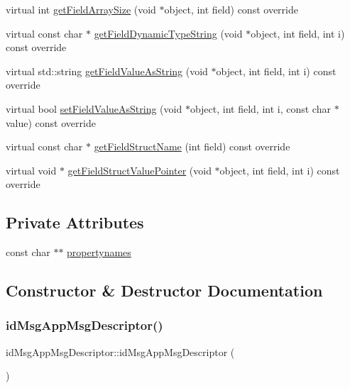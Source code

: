 \begin{DoxyCompactItemize}
virtual int \hyperlink{classidMsgAppMsgDescriptor_a55b2f838a298f91b5a0ca06fab71bcad}{get\+Field\+Array\+Size} (void $\ast$object, int field) const override
\item 
virtual const char $\ast$ \hyperlink{classidMsgAppMsgDescriptor_a166e1858ebf5b4c0115b540601799992}{get\+Field\+Dynamic\+Type\+String} (void $\ast$object, int field, int i) const override
\item 
virtual std\+::string \hyperlink{classidMsgAppMsgDescriptor_a42e71d687276c6b4ffd5d812eb9216a3}{get\+Field\+Value\+As\+String} (void $\ast$object, int field, int i) const override
\item 
virtual bool \hyperlink{classidMsgAppMsgDescriptor_a6293893d265e9968a97f9226dac829e9}{set\+Field\+Value\+As\+String} (void $\ast$object, int field, int i, const char $\ast$value) const override
\item 
virtual const char $\ast$ \hyperlink{classidMsgAppMsgDescriptor_ab4329d8695157a2583bf560578eca364}{get\+Field\+Struct\+Name} (int field) const override
\item 
virtual void $\ast$ \hyperlink{classidMsgAppMsgDescriptor_a8453c0ef000997f88024f1be37f1e5be}{get\+Field\+Struct\+Value\+Pointer} (void $\ast$object, int field, int i) const override
\end{DoxyCompactItemize}
\subsection*{Private Attributes}
\begin{DoxyCompactItemize}
\item 
const char $\ast$$\ast$ \hyperlink{classidMsgAppMsgDescriptor_a0415274a6b02ab2bd2a2c3226a9b4543}{propertynames}
\end{DoxyCompactItemize}


\subsection{Constructor \& Destructor Documentation}
\mbox{\label{classidMsgAppMsgDescriptor_a1f471f84ba71baffc0c0bedf29ff5522}} 
\subsubsection{\texorpdfstring{id\+Msg\+App\+Msg\+Descriptor()}{idMsgAppMsgDescriptor()}}
{\footnotesize\ttfamily id\+Msg\+App\+Msg\+Descriptor\+::id\+Msg\+App\+Msg\+Descriptor (\begin{DoxyParamCaption}{ }\end{DoxyParamCaption})}

